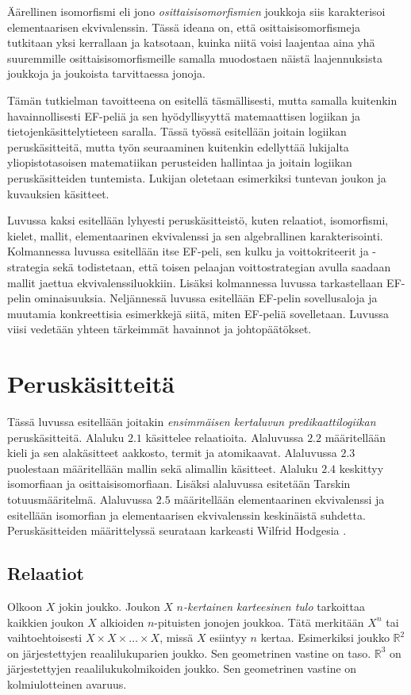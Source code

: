 \documentclass[finnish]{tktltiki2}
\theoremstyle{definition}
\theoremstyle{remark}
\begin{document}
Äärellinen isomorfismi eli jono \textit{osittaisisomorfismien} joukkoja siis karakterisoi elementaarisen ekvivalenssin. Tässä ideana on, että osittaisisomorfismeja tutkitaan yksi kerrallaan ja katsotaan, kuinka niitä voisi laajentaa aina yhä suuremmille osittaisisomorfismeille samalla muodostaen näistä laajennuksista joukkoja ja joukoista tarvittaessa jonoja.

Tämän tutkielman tavoitteena on esitellä täsmällisesti, mutta samalla kuitenkin havainnollisesti EF-peliä ja sen hyödyllisyyttä matemaattisen logiikan ja tietojenkäsittelytieteen saralla. Tässä työssä esitellään joitain logiikan peruskäsitteitä, mutta työn seuraaminen kuitenkin edellyttää lukijalta yliopistotasoisen matematiikan perusteiden hallintaa ja joitain logiikan peruskäsitteiden tuntemista. Lukijan oletetaan esimerkiksi tuntevan joukon ja kuvauksien käsitteet.

Luvussa kaksi esitellään lyhyesti peruskäsitteistö, kuten relaatiot, isomorfismi, kielet, mallit, elementaarinen ekvivalenssi ja sen algebrallinen karakterisointi. Kolmannessa luvussa esitellään itse EF-peli, sen kulku ja voittokriteerit ja -strategia sekä todistetaan, että toisen pelaajan voittostrategian avulla saadaan mallit jaettua ekvivalenssiluokkiin. Lisäksi kolmannessa luvussa tarkastellaan EF-pelin ominaisuuksia. Neljännessä luvussa esitellään EF-pelin sovellusaloja ja muutamia konkreettisia esimerkkejä siitä, miten EF-peliä sovelletaan. Luvussa viisi vedetään yhteen tärkeimmät havainnot ja johtopäätökset.

\section{Peruskäsitteitä}
Tässä luvussa esitellään joitakin \textit{ensimmäisen kertaluvun predikaattilogiikan} peruskäsitteitä. Alaluku $2.1$ käsittelee relaatioita. Alaluvussa $2.2$ määritellään kieli ja sen alakäsitteet aakkosto, termit ja atomikaavat. Alaluvussa $2.3$ puolestaan määritellään mallin sekä alimallin käsitteet. Alaluku $2.4$ keskittyy isomorfiaan ja osittaisisomorfiaan. Lisäksi alaluvussa esitetään Tarskin totuusmääritelmä. Alaluvussa $2.5$ määritellään elementaarinen ekvivalenssi ja esitellään isomorfian ja elementaarisen ekvivalenssin keskinäistä suhdetta. Peruskäsitteiden määrittelyssä seurataan karkeasti Wilfrid Hodgesia \cite{Hod97}.

\subsection{Relaatiot}
Olkoon $X$ jokin joukko. Joukon $X$ $n$\textit{-kertainen karteesinen tulo} tarkoittaa kaikkien joukon $X$ alkioiden $n$-pituisten jonojen joukkoa. Tätä merkitään $X^n$ tai vaihtoehtoisesti $X \times X \times \ldots \times X$, missä $X$ esiintyy $n$ kertaa. Esimerkiksi joukko $\mathbb{R}^2$ on järjestettyjen reaalilukuparien joukko. Sen geometrinen vastine on taso. $\mathbb{R}^3$ on järjestettyjen reaalilukukolmikoiden joukko. Sen geometrinen vastine on kolmiulotteinen avaruus. 
\end{document}
